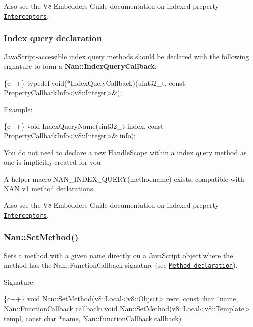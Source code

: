 Also see the V8 Embedders Guide documentation on indexed property \href{https://developers.google.com/v8/embed#interceptors}{\tt Interceptors}.

\label{_api_nan_index_query}%
 \subsubsection*{Index query declaration}

Java\+Script-\/accessible index query methods should be declared with the following signature to form a {\bfseries {\ttfamily Nan\+::\+Index\+Query\+Callback}}\+:


\begin{DoxyCode}
\{c++\}
typedef void(*IndexQueryCallback)(uint32\_t,
                                  const PropertyCallbackInfo<v8::Integer>&);
\end{DoxyCode}


Example\+:


\begin{DoxyCode}
\{c++\}
void IndexQueryName(uint32\_t index, const PropertyCallbackInfo<v8::Integer>& info);
\end{DoxyCode}


You do not need to declare a new {\ttfamily Handle\+Scope} within a index query method as one is implicitly created for you.

A helper macro {\ttfamily N\+A\+N\+\_\+\+I\+N\+D\+E\+X\+\_\+\+Q\+U\+E\+R\+Y(methodname)} exists, compatible with N\+AN v1 method declarations.

Also see the V8 Embedders Guide documentation on indexed property \href{https://developers.google.com/v8/embed#interceptors}{\tt Interceptors}.

\label{_api_nan_set_method}%
 \subsubsection*{Nan\+::\+Set\+Method()}

Sets a method with a given name directly on a Java\+Script object where the method has the {\ttfamily Nan\+::\+Function\+Callback} signature (see \href{#api_nan_method}{\tt Method declaration}).

Signature\+:


\begin{DoxyCode}
\{c++\}
void Nan::SetMethod(v8::Local<v8::Object> recv,
                    const char *name,
                    Nan::FunctionCallback callback)
void Nan::SetMethod(v8::Local<v8::Template> templ,
                    const char *name,
                    Nan::FunctionCallback callback)
\end{DoxyCode}


